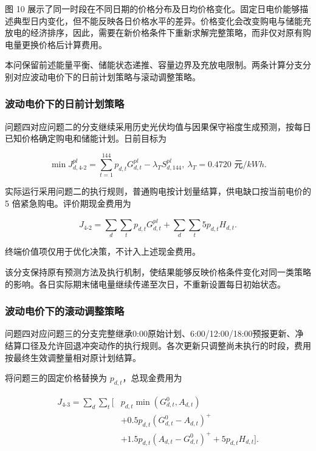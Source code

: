 \documentclass[withoutpreface,bwprint]{cumcmthesis}
\begin{document}
图 10
展示了同一时段在不同日期的价格分布及日均价格变化。固定日电价能够描述典型日内变化，但不能反映各日价格水平的差异。价格变化会改变购电与储能充放电的经济排序，因此，需要在新价格条件下重新求解完整策略，而非仅对原有购电量更换价格后计算费用。

本问保留前述能量平衡、储能状态递推、容量边界及充放电限制。两条计算分支分别对应波动电价下的日前计划策略与滚动调整策略。

\subsubsection{波动电价下的日前计划策略}

问题四对应问题二的分支继续采用历史光伏均值与因果保守裕度生成预测，按每日已知价格确定购电和储能计划。日前目标为

\begin{equation}\min J_{d,4\text{-}2}^{pl} = \sum_{t = 1}^{144}p_{d,t}G_{d,t}^{pl} - \lambda_{T}S_{d,144}^{pl},\ \lambda_{T} = 0.4720\text{~元}/kWh.\end{equation}

实际运行采用问题二的执行规则，普通购电按计划量结算，供电缺口按当前电价的
5 倍紧急购电。评价期现金费用为

\begin{equation}J_{4\text{-}2} = \sum_{d}^{}{\sum_{t}^{}p_{d,t}}G_{d,t}^{pl} + \sum_{d}^{}{\sum_{t}^{}5}p_{d,t}H_{d,t}.\end{equation}

终端价值项仅用于优化决策，不计入上述现金费用。

该分支保持原有预测方法及执行机制，使结果能够反映价格条件变化对同一类策略的影响。各日实际期末储电量继续传递至次日，不重新设置每日初始状态。

\subsubsection{波动电价下的滚动调整策略}

问题四对应问题三的分支完整继承0:00原始计划、6:00/12:00/18:00预报更新、净结算口径及允许回退冲突动作的执行规则。各次更新只调整尚未执行的时段，费用按最终生效调整量相对原计划结算。

将问题三的固定价格替换为 \(p_{d,t}\)，总现金费用为

\begin{equation}\begin{aligned}
J_{4\text{-}3} = \sum_{d}^{}{\sum_{t}^{}\lbrack} & p_{d,t}\min\left( G_{d,t}^{0},A_{d,t} \right) \\
 & + 0.5p_{d,t}\left( G_{d,t}^{0} - A_{d,t} \right)^{+} \\
 & + 1.5p_{d,t}\left( A_{d,t} - G_{d,t}^{0} \right)^{+} + 5p_{d,t}H_{d,t}\rbrack.
\end{aligned}\end{equation}
\end{document}
